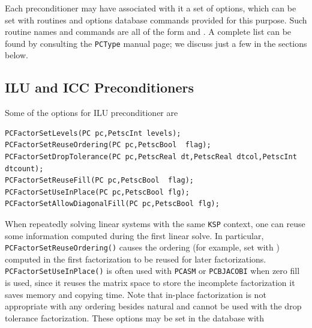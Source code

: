 Each preconditioner may have associated with it a set of options,
which can be set with routines and options database commands provided
for this purpose.  Such routine names and commands are all of the form
 and .
A complete list can be found by consulting the \lstinline{PCType} manual page; we discuss
just a few in the sections below.

\subsection{ILU and ICC Preconditioners}
\label{sec_ilu_icc}

Some of the options for ILU preconditioner are
\begin{lstlisting}
PCFactorSetLevels(PC pc,PetscInt levels);
PCFactorSetReuseOrdering(PC pc,PetscBool  flag);
PCFactorSetDropTolerance(PC pc,PetscReal dt,PetscReal dtcol,PetscInt dtcount);
PCFactorSetReuseFill(PC pc,PetscBool  flag);
PCFactorSetUseInPlace(PC pc,PetscBool flg);
PCFactorSetAllowDiagonalFill(PC pc,PetscBool flg);
\end{lstlisting}

When repeatedly solving linear systems with the same \lstinline{KSP}
context, one can reuse some information  computed
during the first linear solve.
In particular, \lstinline{PCFactorSetReuseOrdering()} causes the ordering  (for example, set with
 ) computed in the first factorization to be reused
for later factorizations. 
\lstinline{PCFactorSetUseInPlace()} is often used with
\lstinline{PCASM} or \lstinline{PCBJACOBI} when zero fill is used, since it reuses the
matrix space to store the incomplete factorization it saves memory and
copying time. Note that in-place factorization is not appropriate with
any ordering besides natural and cannot be used with the drop tolerance
factorization. These options may be set in the database with
\begin{tightitemize}
\item {}
\item {}
\item {}
\item {}
\item {}
\item {}
\end{tightitemize}
 
 

